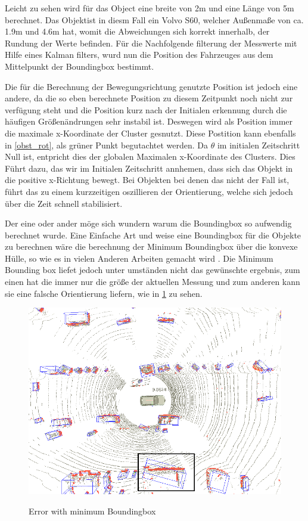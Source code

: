 \documentclass[11pt,oneside,openright]{mpreport}
\begin{document}
Leicht zu sehen wird für das Object eine breite von 2m und eine Länge von 5m berechnet. Das Objektist in diesm Fall ein Volvo S60, welcher Außenmaße von ca. 1.9m und 4.6m hat,
womit die Abweichungen sich korrekt innerhalb, der Rundung der Werte befinden. Für die Nachfolgende filterung der Messwerte mit Hilfe eines Kalman filters, wurd nun
die Position des Fahrzeuges aus dem Mittelpunkt der Boundingbox bestimmt.

Die für die Berechnung der Bewegungsrichtung genutzte Position ist jedoch eine andere, da die so eben berechnete Position zu diesem Zeitpunkt noch nicht zur verfügung steht und
die Position kurz nach der Initialen erkennung durch die häufigen Größenändrungen sehr instabil ist. Deswegen wird als Position immer die maximale x-Koordinate der Cluster gesnutzt.
Diese Postition kann ebenfalls in \cref{obst_rot}, als grüner Punkt begutachtet werden.
Da $\theta$ im initialen Zeitschritt Null ist, entpricht dies der globalen Maximalen x-Koordinate des Clusters. Dies Führt dazu, das wir im Initialen Zeitschritt annhemen, dass sich das Objekt
in die positive x-Richtung bewegt. Bei Objekten bei denen das nicht der Fall ist, führt das zu einem kurzzeitigen oszillieren der Orientierung, welche sich jedoch über die Zeit schnell stabilisiert.


Der eine oder ander möge sich wundern warum die Boundingbox so aufwendig berechnet wurde. Eine Einfache Art und weise eine Boundingbox für die Objekte zu berechnen wäre die berechnung
der Minimum Boundingbox über die konvexe Hülle, so wie es in vielen Anderen Arbeiten gemacht wird \cite{Zhang,Himmelsbach2009}. Die Minimum Bounding box liefet jedoch unter umständen nicht das gewünschte
ergebnis, zum einen hat die immer nur die größe der aktuellen Messung und zum anderen kann sie eine falsche Orientierung liefern, wie in \cref{min_box} zu sehen.

\begin{figure}[!ht]
\caption{Error with minimum Boundingbox \cite{Himmelsbach2009}}
\includegraphics[width=\textwidth]{bilder/min_bound.png}
\label{min_box}
\end{figure}
\end{document}
